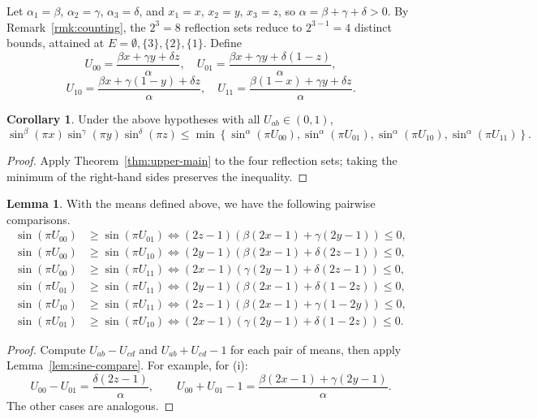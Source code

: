 \documentclass[12pt]{amsart}
\theoremstyle{definition}
\newtheorem{lemma}{Lemma}[section]
\newtheorem{corollary}{Corollary}[section]
\begin{document}
Let $\alpha_1 = \beta$, $\alpha_2 = \gamma$, $\alpha_3 = \delta$, and $x_1 = x$, $x_2 = y$, $x_3 = z$, so $\alpha = \beta + \gamma + \delta > 0$. By Remark~\ref{rmk:counting}, the $2^3=8$ reflection sets reduce to $2^{3-1}=4$ distinct bounds, attained at $E=\emptyset,\{3\},\{2\},\{1\}$. Define
\[
U_{00} = \frac{\beta x + \gamma y + \delta z}{\alpha},\quad
U_{01} = \frac{\beta x + \gamma y + \delta(1-z)}{\alpha},
\]
\[
U_{10} = \frac{\beta x + \gamma(1-y) + \delta z}{\alpha},\quad
U_{11} = \frac{\beta(1-x) + \gamma y + \delta z}{\alpha}.
\]

\begin{corollary}\label{cor:3d-upper}
Under the above hypotheses with all $U_{ab} \in (0,1)$,
\[
\sin^{\beta}(\pi x) \sin^{\gamma}(\pi y) \sin^{\delta}(\pi z) \leq \min\left\{\sin^{\alpha}(\pi U_{00}), \sin^{\alpha}(\pi U_{01}), \sin^{\alpha}(\pi U_{10}), \sin^{\alpha}(\pi U_{11})\right\}.
\]
\end{corollary}

\begin{proof}
Apply Theorem~\ref{thm:upper-main} to the four reflection sets; taking the minimum of the right-hand sides preserves the inequality.
\end{proof}

\begin{lemma}\label{lem:3d-upper-compare}
With the means defined above, we have the following pairwise comparisons.
\begin{align}
\sin(\pi U_{00}) &\geq \sin(\pi U_{01}) \iff (2z - 1)\left(\beta(2x-1) + \gamma(2y-1)\right) \leq 0, \tag{i} \\
\sin(\pi U_{00}) &\geq \sin(\pi U_{10}) \iff (2y - 1)\left(\beta(2x-1) + \delta(2z-1)\right) \leq 0, \tag{ii} \\
\sin(\pi U_{00}) &\geq \sin(\pi U_{11}) \iff (2x - 1)\left(\gamma(2y-1) + \delta(2z-1)\right) \leq 0, \tag{iii} \\
\sin(\pi U_{01}) &\geq \sin(\pi U_{11}) \iff (2y - 1)\left(\beta(2x-1) + \delta(1-2z)\right) \leq 0, \tag{iv} \\
\sin(\pi U_{10}) &\geq \sin(\pi U_{11}) \iff (2z - 1)\left(\beta(2x-1) + \gamma(1-2y)\right) \leq 0, \tag{v} \\
\sin(\pi U_{01}) &\geq \sin(\pi U_{10}) \iff (2x - 1)\left(\gamma(2y-1) + \delta(1-2z)\right) \leq 0. \tag{vi}
\end{align}
\end{lemma}

\begin{proof}
Compute $U_{ab}-U_{cd}$ and $U_{ab}+U_{cd}-1$ for each pair of means, then apply Lemma~\ref{lem:sine-compare}. For example, for (i):
\[
U_{00} - U_{01} = \frac{\delta(2z-1)}{\alpha}, \qquad
U_{00} + U_{01} - 1 = \frac{\beta(2x-1) + \gamma(2y-1)}{\alpha}.
\]
The other cases are analogous.
\end{proof}
\end{document}
